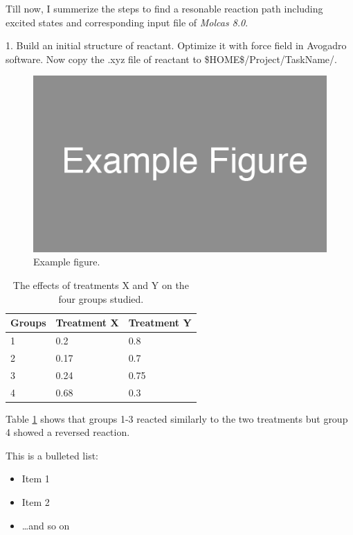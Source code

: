 \documentclass[idxtotoc,hyperref,openany]{labbook} %
\begin{document}
Till now, I summerize the steps to find a resonable reaction path including excited states and corresponding input file of \textit{Molcas 8.0}.\par 

1. Build an initial structure of reactant. Optimize it with force field in Avogadro software. Now copy the .xyz file of reactant to \$HOME\$/Project/TaskName/. 





\begin{figure}[H] %
\begin{center}
\includegraphics[width=0.5\linewidth]{example_figure}
\end{center}
\caption{Example figure.}
\label{fig:example_figure}
\end{figure}


\begin{table}[H]
\begin{tabular}{l l l}
\toprule
\textbf{Groups} & \textbf{Treatment X} & \textbf{Treatment Y} \\
\toprule
1 & 0.2 & 0.8\\
2 & 0.17 & 0.7\\
3 & 0.24 & 0.75\\
4 & 0.68 & 0.3\\
\bottomrule
\end{tabular}
\caption{The effects of treatments X and Y on the four groups studied.}
\label{tab:treatments_xy}
\end{table}
Table \ref{tab:treatments_xy} shows that groups 1-3 reacted similarly to the two treatments but group 4 showed a reversed reaction.

This is a bulleted list:

\begin{itemize}
\item Item 1
\item Item 2
\item \ldots and so on
\end{itemize}


\end{document}
